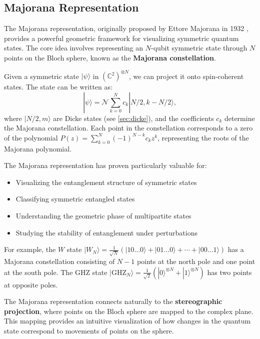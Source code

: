 \documentclass[12pt,a4paper]{article}
\begin{document}
\subsection{Majorana Representation}
\label{sec:majorana}

The Majorana representation, originally proposed by Ettore Majorana in 1932 \cite{majorana1932atomi}, provides a powerful geometric framework for visualizing symmetric quantum states. The core idea involves representing an $N$-qubit symmetric state through $N$ points on the Bloch sphere, known as the \textbf{Majorana constellation}.

Given a symmetric state $|\psi\rangle$ in $(\mathbb{C}^2)^{\otimes N}$, we can project it onto spin-coherent states. The state can be written as:
\begin{equation}
	|\psi\rangle = \mathcal{N} \sum_{k=0}^{N} c_k |N/2, k - N/2\rangle,
\end{equation}
where $|N/2, m\rangle$ are Dicke states (see \cref{sec:dicke}), and the coefficients $c_k$ determine the Majorana constellation. Each point in the constellation corresponds to a zero of the polynomial $P(z) = \sum_{k=0}^{N} (-1)^{N-k} c_k z^k$, representing the roots of the Majorana polynomial.

The Majorana representation has proven particularly valuable for:
\begin{itemize}
	\item Visualizing the entanglement structure of symmetric states
	\item Classifying symmetric entangled states
	\item Understanding the geometric phase of multipartite states
	\item Studying the stability of entanglement under perturbations
\end{itemize}

For example, the $W$ state $|W_N\rangle = \frac{1}{\sqrt{N}}(|10\ldots 0\rangle + |01\ldots 0\rangle + \cdots + |00\ldots 1\rangle)$ has a Majorana constellation consisting of $N-1$ points at the north pole and one point at the south pole. The GHZ state $|\text{GHZ}_N\rangle = \frac{1}{\sqrt{2}}(|0\rangle^{\otimes N} + |1\rangle^{\otimes N})$ has two points at opposite poles.

The Majorana representation connects naturally to the \textbf{stereographic projection}, where points on the Bloch sphere are mapped to the complex plane. This mapping provides an intuitive visualization of how changes in the quantum state correspond to movements of points on the sphere.
\end{document}
